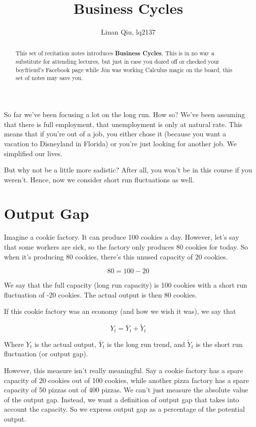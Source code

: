 \documentclass[11pt]{scrartcl}
\title{Business Cycles}
\author{Linan Qiu, lq2137}
\newcommand{\jon}{J\'{o}n }
\begin{document}
\maketitle

\begin{abstract}
This set of recitation notes introduces \textbf{Business Cycles}. This is in no way a substitute for attending lectures, but just in case you dozed off or checked your boyfriend's Facebook page while \jon was working Calculus magic on the board, this set of notes may save you.
\end{abstract}

So far we've been focusing a lot on the long run. How so? We've been assuming that there is full employment, that unemployment is only at natural rate. This means that if you're out of a job, you either chose it (because you want a vacation to Disneyland in Florida) or you're just looking for another job. We simplified our lives.

But why not be a little more sadistic? After all, you won't be in this course if you weren't. Hence, now we consider short run fluctuations as well.

\section{Output Gap}

Imagine a cookie factory. It can produce 100 cookies a day. However, let's say that some workers are sick, so the factory only produces 80 cookies for today. So when it's producing 80 cookies, there's this unused capacity of 20 cookies. 

\[ 80 = 100 - 20 \]

We say that the full capacity (long run capacity) is 100 cookies with a short run fluctuation of -20 cookies. The actual output is then 80 cookies. 

If this cookie factory was an economy (and how we wish it was), we say that 

\[Y_t = \bar{Y}_t + \tilde{Y}_t \]

Where $Y_t$ is the actual output, $\bar{Y}_t$ is the long run trend, and $\tilde{Y}_t$ is the short run fluctuation (or output gap).

However, this measure isn't really meaningful. Say a cookie factory has a spare capacity of 20 cookies out of 100 cookies, while another pizza factory has a spare capacity of 50 pizzas out of 400 pizzas. We can't just measure the absolute value of the output gap. Instead, we want a definition of output gap that takes into account the capacity. So we express output gap as a percentage of the potential output.
\end{document}

